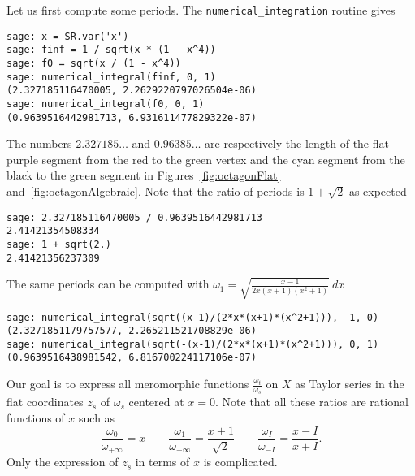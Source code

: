 \documentclass[a4paper,12pt]{article}
\begin{document}
\smallskip

Let us first compute some periods. The \texttt{numerical\_integration} routine gives
\begin{verbatim}
sage: x = SR.var('x')
sage: finf = 1 / sqrt(x * (1 - x^4))
sage: f0 = sqrt(x / (1 - x^4))
sage: numerical_integral(finf, 0, 1)
(2.327185116470005, 2.2629220797026504e-06)
sage: numerical_integral(f0, 0, 1)
(0.9639516442981713, 6.931611477829322e-07)
\end{verbatim}
The numbers $2.327185\ldots$ and $0.96385\ldots$ are respectively the length of the
flat purple segment from the red to the green vertex and the cyan segment from the
black to the green segment in Figures~\ref{fig:octagonFlat} and~\ref{fig:octagonAlgebraic}. Note that the ratio of
periods is $1 + \sqrt{2}$ as expected
\begin{verbatim}
sage: 2.327185116470005 / 0.9639516442981713
2.41421354508334
sage: 1 + sqrt(2.)
2.41421356237309
\end{verbatim}
The same periods can be computed with $\omega_1 = \sqrt{\frac{x-1}{2x(x+1)(x^2+1)}}\ dx$
\begin{verbatim}
sage: numerical_integral(sqrt((x-1)/(2*x*(x+1)*(x^2+1))), -1, 0)
(2.3271851179757577, 2.265211521708829e-06)
sage: numerical_integral(sqrt(-(x-1)/(2*x*(x+1)*(x^2+1))), 0, 1)
(0.9639516438981542, 6.816700224117106e-07)
\end{verbatim}

\smallskip

Our goal is to express all meromorphic functions $\frac{\omega_t}{\omega_s}$ on $X$ as Taylor series in the flat
coordinates $z_s$ of $\omega_s$ centered at $x=0$. Note that all these ratios are rational functions of $x$ such as
\[
\frac{\omega_0}{\omega_{+\infty}} = x
\qquad
\frac{\omega_1}{\omega_{+\infty}} = \frac{x+1}{\sqrt{2}}
\qquad
\frac{\omega_I}{\omega_{-I}} = \frac{x-I}{x+I}.
\]
Only the expression of $z_s$ in terms of $x$ is complicated.
\end{document}
